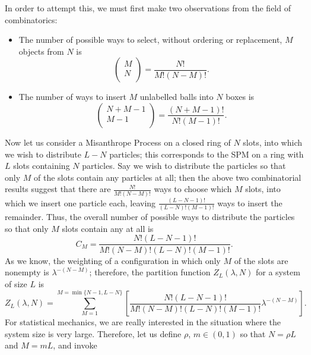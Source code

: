 In order to attempt this, we must first make two observations from the field of combinatorics:
\begin{itemize}
 \item The number of possible ways to select, without ordering or replacement, $M$ objects from $N$
 is
 \begin{equation}
  \begin{pmatrix}
   M \\
   N \\
  \end{pmatrix}
  = \frac{N!}{M!(N-M)!}.
 \end{equation}
\item The number of ways to insert $M$ unlabelled balls into $N$ boxes is
\begin{equation}
 \begin{pmatrix}
  N+M-1 \\
  M-1 \\
 \end{pmatrix}
 = \frac{(N+M-1)!}{N!(M-1)!}.
\end{equation}
 \end{itemize}
Now let us consider a Misanthrope Process on a closed ring of $N$ slots, into which we wish to
distribute $L-N$ particles; this corresponds to the SPM on a ring with $L$ slots containing $N$
particles. Say we wish to distribute the particles so that only $M$ of the slots
contain any particles at all; then the above two combinatorial results suggest that there are
$\frac{N!}{M!(N-M)!}$ ways to choose which $M$ slots, into which we insert one particle each,
leaving $\frac{(L-N-1)!}{(L-N)!(M-1)!}$ ways to insert the remainder. Thus, the overall number of
possible ways to distribute the particles so that only $M$ slots contain any at all is
\begin{equation}
 C_M = \frac{N!(L-N-1)!}{M!(N-M)!(L-N)!(M-1)!}.
\end{equation}
As we know, the weighting of a configuration in which only $M$ of the slots are nonempty is
$\lambda^{-(N-M)}$; therefore, the partition function $Z_L (\lambda, N)$ for a system of size $L$ is
\begin{equation}
 Z_L (\lambda, N) = \sum_{M=1}^{M=\min{ \{ N-1, L-N \} }} \left[ \frac{N!(L-N-1)!}{M!(N-M)!(L-N)!(M-1)!}
 \lambda^{-(N-M)} \right].
\end{equation}
For statistical mechanics, we are really interested in the situation where the system size is very
large. Therefore, let us define $\rho$, $m \in (0, 1)$ so that $N = \rho L$ and $M = mL$, and invoke
